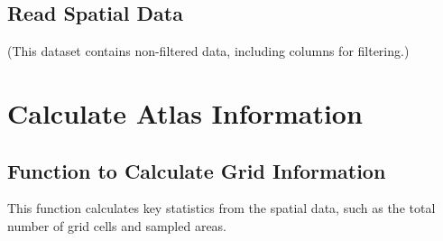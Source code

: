 \documentclass[
  letterpaper,
  DIV=11,
  numbers=noendperiod]{scrreprt}
\newenvironment{Shaded}{\begin{snugshade}}{\end{snugshade}}
\newcommand{\CommentTok}[1]{\textcolor[rgb]{0.37,0.37,0.37}{#1}}
\newcommand{\FunctionTok}[1]{\textcolor[rgb]{0.28,0.35,0.67}{#1}}
\newcommand{\NormalTok}[1]{\textcolor[rgb]{0.00,0.23,0.31}{#1}}
\newcommand{\OtherTok}[1]{\textcolor[rgb]{0.00,0.23,0.31}{#1}}
\newcommand{\SpecialCharTok}[1]{\textcolor[rgb]{0.37,0.37,0.37}{#1}}
\begin{document}
\hypertarget{read-spatial-data}{%
\section{Read Spatial Data}\label{read-spatial-data}}

(This dataset contains non-filtered data, including columns for
filtering.)

\begin{Shaded}
\end{Shaded}


\hypertarget{calculate-atlas-information}{%
\chapter{Calculate Atlas
Information}\label{calculate-atlas-information}}

\hypertarget{function-to-calculate-grid-information}{%
\section{Function to Calculate Grid
Information}\label{function-to-calculate-grid-information}}

This function calculates key statistics from the spatial data, such as
the total number of grid cells and sampled areas.
\end{document}

